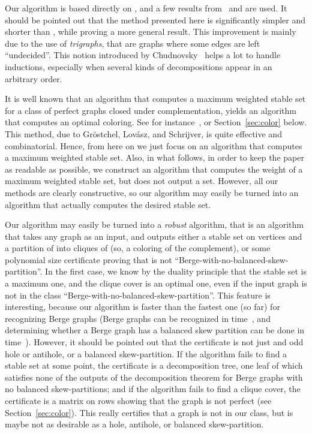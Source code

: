 \documentclass[11 pt] {article}
\begin{document}
Our algorithm is based directly on \cite{thesis,trigraphs}, and a few
results from~\cite{nicolas:bsp} and \cite{nicolas.kristina:2-join} are
used.  It should be pointed out that the method presented here is
significantly simpler and shorter than \cite{nicolas.kristina:2-join},
while proving a more general result.  This improvement is mainly due
to the use of \emph{trigraphs}, that are graphs where some edges are
left ``undecided''.  This notion introduced by
Chudnovsky~\cite{thesis,trigraphs} helps a lot to handle inductions,
especially when several kinds of decompositions appear in an arbitrary
order.

It is well known that an  algorithm that computes a maximum
weighted stable set for a class of perfect graphs closed under
complementation, yields an  algorithm that computes an
optimal coloring.  See for instance~\cite{KrSe:colorP},
\cite{schrijver:opticomb} or Section~\ref{sec:color} below.  This
method, due to Gr\"ostchel, Lov\'asz, and Schrijver, is quite
effective and combinatorial.  Hence, from here on we just focus on an
algorithm that computes a maximum weighted stable set.  Also, in what
follows, in order to keep the paper as readable as possible, we
construct an algorithm that computes the weight of a maximum weighted
stable set, but does not output a set.  However, all our methods are
clearly constructive, so our algorithm may easily be turned into an
algorithm that actually computes the desired stable set.


Our algorithm may easily be turned into a \emph{robust} algorithm,
that is an algorithm that takes any graph as an input, and outputs
either a stable set on  vertices and a partition of  into 
cliques of  (so, a coloring of the complement), or some polynomial
size certificate proving that  is not
``Berge-with-no-balanced-skew-partition''.  In the first case, we know
by the duality principle that the stable set is a maximum one, and the
clique cover is an optimal one, even if the input graph is not in the
class ``Berge-with-no-balanced-skew-partition''.  This feature is
interesting, because our algorithm is faster than the fastest one (so
far) for recognizing Berge graphs (Berge graphs can be recognized in
 time~\cite{chudnovsky.c.l.s.v:reco}, and determining
whether a Berge graph has a balanced skew partition can be done in
 time~\cite{nicolas:bsp,ChHaTrVu:2-join}).  However, it should be
pointed out that the certificate is not just and odd hole or antihole,
or a balanced skew-partition.  If the algorithm fails to find a stable
set at some point, the certificate is a decomposition tree, one leaf
of which satisfies none of the outputs of the decomposition theorem
for Berge graphs with no balanced skew-partitions; and if the
algorithm fails to find a clique cover, the certificate is a matrix on
 rows showing that the graph is not perfect (see
Section~\ref{sec:color}).  This really certifies that a graph is not
in our class, but is maybe not as desirable as a hole, antihole, or
balanced skew-partition.
\end{document}
